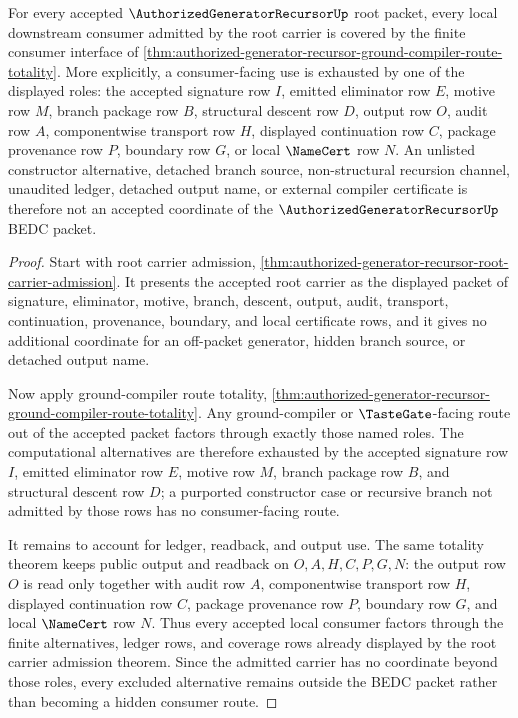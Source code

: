 \begin{lemma}
\label{lem:authorized-generator-recursor-root-admission-downstream-coverage}
For every accepted $\AuthorizedGeneratorRecursorUp$ root packet, every local downstream consumer admitted by the root carrier is covered by the finite consumer interface of \autoref{thm:authorized-generator-recursor-ground-compiler-route-totality}. More explicitly, a consumer-facing use is exhausted by one of the displayed roles: the accepted signature row $I$, emitted eliminator row $E$, motive row $M$, branch package row $B$, structural descent row $D$, output row $O$, audit row $A$, componentwise transport row $H$, displayed continuation row $C$, package provenance row $P$, boundary row $G$, or local $\NameCert$ row $N$. An unlisted constructor alternative, detached branch source, non-structural recursion channel, unaudited ledger, detached output name, or external compiler certificate is therefore not an accepted coordinate of the $\AuthorizedGeneratorRecursorUp$ BEDC packet.
\end{lemma}
\begin{proof}
Start with root carrier admission, \autoref{thm:authorized-generator-recursor-root-carrier-admission}. It presents the accepted root carrier as the displayed packet of signature, eliminator, motive, branch, descent, output, audit, transport, continuation, provenance, boundary, and local certificate rows, and it gives no additional coordinate for an off-packet generator, hidden branch source, or detached output name.

Now apply ground-compiler route totality, \autoref{thm:authorized-generator-recursor-ground-compiler-route-totality}. Any ground-compiler or $\TasteGate$-facing route out of the accepted packet factors through exactly those named roles. The computational alternatives are therefore exhausted by the accepted signature row $I$, emitted eliminator row $E$, motive row $M$, branch package row $B$, and structural descent row $D$; a purported constructor case or recursive branch not admitted by those rows has no consumer-facing route.

It remains to account for ledger, readback, and output use. The same totality theorem keeps public output and readback on $O,A,H,C,P,G,N$: the output row $O$ is read only together with audit row $A$, componentwise transport row $H$, displayed continuation row $C$, package provenance row $P$, boundary row $G$, and local $\NameCert$ row $N$. Thus every accepted local consumer factors through the finite alternatives, ledger rows, and coverage rows already displayed by the root carrier admission theorem. Since the admitted carrier has no coordinate beyond those roles, every excluded alternative remains outside the BEDC packet rather than becoming a hidden consumer route.
\end{proof}
